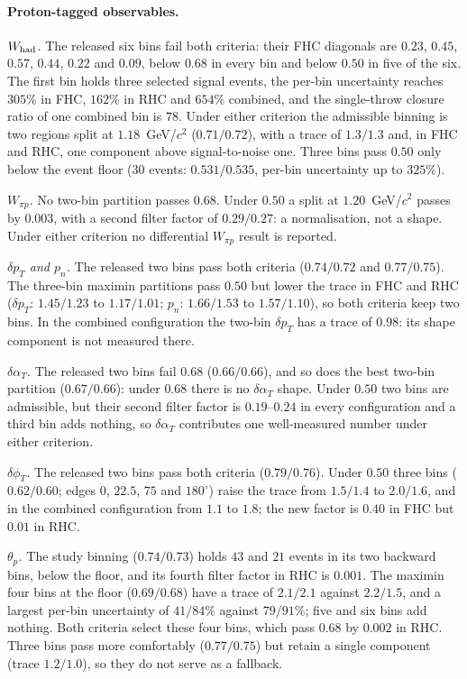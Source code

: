 \documentclass[11pt,a4paper]{article}
\begin{document}
\paragraph{Proton-tagged observables.}
\emph{$W_{\rm had}$.} The released six bins fail both criteria: their FHC diagonals are $0.23$,
$0.45$, $0.57$, $0.44$, $0.22$ and $0.09$, below $0.68$ in every bin and below $0.50$ in five of the
six. The first bin holds three selected signal events, the
per-bin uncertainty reaches $305\%$ in FHC, $162\%$ in RHC and $654\%$ combined, and the single-throw
closure ratio of one combined bin is $78$. Under either criterion the admissible binning is two
regions split at $1.18$~GeV/$c^2$ ($0.71/0.72$), with a trace of $1.3/1.3$ and, in FHC and RHC, one
component above signal-to-noise one. Three bins pass $0.50$ only below the event floor ($30$ events:
$0.531/0.535$,
per-bin uncertainty up to $325\%$).

\emph{$W_{\pi p}$.} No two-bin partition passes $0.68$. Under $0.50$ a split at $1.20$~GeV/$c^2$
passes by $0.003$, with a second filter factor of $0.29/0.27$: a normalisation, not a shape. Under
either criterion no differential $W_{\pi p}$ result is reported.

\emph{$\delta p_T$ and $p_n$.} The released two bins pass both criteria ($0.74/0.72$ and
$0.77/0.75$). The three-bin maximin partitions pass $0.50$ but lower the trace in FHC and RHC
($\delta p_T$: $1.45/1.23$ to $1.17/1.01$; $p_n$: $1.66/1.53$ to $1.57/1.10$), so both criteria
keep two bins. In the combined configuration the two-bin $\delta p_T$ has a trace of $0.98$: its
shape component is not measured there.

\emph{$\delta\alpha_T$.} The released two bins fail $0.68$ ($0.66/0.66$), and so does the best
two-bin partition ($0.67/0.66$): under $0.68$ there is no $\delta\alpha_T$ shape. Under $0.50$ two
bins are admissible, but their second filter factor is $0.19$--$0.24$ in every configuration and a
third bin adds nothing, so $\delta\alpha_T$ contributes one well-measured number under either
criterion.

\emph{$\delta\phi_T$.} The released two bins pass both criteria ($0.79/0.76$). Under $0.50$ three
bins ($0.62/0.60$; edges $0$, $22.5$, $75$ and $180^\circ$) raise the trace from $1.5/1.4$ to
$2.0/1.6$, and in the combined configuration from $1.1$ to $1.8$; the new factor is $0.40$ in FHC
but $0.01$ in RHC.

\emph{$\theta_p$.} The study binning ($0.74/0.73$) holds $43$ and $21$ events in its two backward
bins, below the floor, and its fourth filter factor in RHC is $0.001$. The maximin four bins at the
floor ($0.69/0.68$) have a trace of $2.1/2.1$ against $2.2/1.5$, and a largest per-bin uncertainty
of $41/84\%$ against $79/91\%$; five and six bins add nothing. Both criteria select these four
bins, which pass $0.68$ by $0.002$ in RHC. Three bins pass more comfortably ($0.77/0.75$) but retain
a single component (trace $1.2/1.0$), so they do not serve as a fallback.
\end{document}
